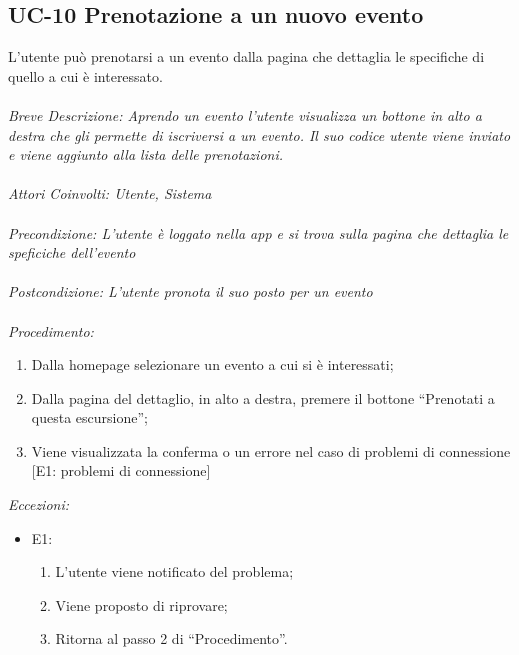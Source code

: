 \subsection{UC-10 Prenotazione a un nuovo evento}
L'utente può prenotarsi a un evento dalla pagina che dettaglia le specifiche di quello a cui è interessato.
\\
\\
\textit{Breve Descrizione: Aprendo un evento l'utente visualizza un bottone in alto a destra che gli permette di iscriversi a un evento. Il suo codice utente viene inviato e viene aggiunto alla lista delle prenotazioni.} 
\\
\\
\textit{Attori Coinvolti: Utente, Sistema}
\\
\\
\textit{Precondizione: L'utente è loggato nella app e si trova sulla pagina che dettaglia le speficiche dell'evento}
\\
\\
\textit{Postcondizione: L'utente pronota il suo posto per un evento}
\\
\\
\textit{Procedimento:}
\begin{enumerate}
	\item Dalla homepage selezionare un evento a cui si è interessati;
	\item Dalla pagina del dettaglio, in alto a destra, premere il bottone ``Prenotati a questa escursione'';
	\item Viene visualizzata la conferma o un errore nel caso di problemi di connessione [E1: problemi di connessione] 
\end{enumerate}


\textit{Eccezioni:}
\begin{itemize}
	\item E1:
	\begin{enumerate}
		\item L'utente viene notificato del problema;
		\item Viene proposto di riprovare;
		\item Ritorna al passo 2 di ``Procedimento''.
	\end{enumerate}
\end{itemize}